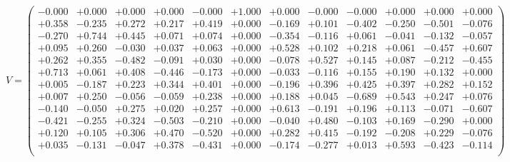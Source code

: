 \documentclass[9pt]{article}
\theoremstyle{plain}
\theoremstyle{definition}
\theoremstyle{remark}
\numberwithin{equation}{section}
\begin{document}
$V = \left(
\begin{array}{
cccccccccccc}
-0.000 & +0.000 & +0.000 & +0.000 & -0.000 & +1.000 & +0.000 & -0.000 & -0.000 & +0.000 & +0.000 & +0.000 \\
+0.358 & -0.235 & +0.272 & +0.217 & +0.419 & +0.000 & -0.169 & +0.101 & -0.402 & -0.250 & -0.501 & -0.076 \\
-0.270 & +0.744 & +0.445 & +0.071 & +0.074 & +0.000 & -0.354 & -0.116 & +0.061 & -0.041 & -0.132 & -0.057 \\
+0.095 & +0.260 & -0.030 & +0.037 & +0.063 & +0.000 & +0.528 & +0.102 & +0.218 & +0.061 & -0.457 & +0.607 \\
+0.262 & +0.355 & -0.482 & -0.091 & +0.030 & +0.000 & -0.078 & +0.527 & +0.145 & +0.087 & -0.212 & -0.455 \\
+0.713 & +0.061 & +0.408 & -0.446 & -0.173 & +0.000 & -0.033 & -0.116 & +0.155 & +0.190 & +0.132 & +0.000 \\
+0.005 & -0.187 & +0.223 & +0.344 & +0.401 & +0.000 & -0.196 & +0.396 & +0.425 & +0.397 & +0.282 & +0.152 \\
+0.007 & +0.250 & -0.056 & -0.059 & +0.238 & +0.000 & +0.188 & +0.045 & -0.689 & +0.543 & +0.247 & +0.076 \\
-0.140 & -0.050 & +0.275 & +0.020 & +0.257 & +0.000 & +0.613 & -0.191 & +0.196 & +0.113 & -0.071 & -0.607 \\
-0.421 & -0.255 & +0.324 & -0.503 & -0.210 & +0.000 & -0.040 & +0.480 & -0.103 & +0.169 & -0.290 & +0.000 \\
+0.120 & +0.105 & +0.306 & +0.470 & -0.520 & +0.000 & +0.282 & +0.415 & -0.192 & -0.208 & +0.229 & -0.076 \\
+0.035 & -0.131 & -0.047 & +0.378 & -0.431 & +0.000 & -0.174 & -0.277 & +0.013 & +0.593 & -0.423 & -0.114 \\
\end{array}
\right)$ \newline 
\end{document}
